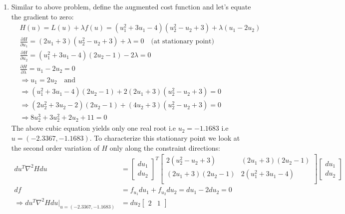 \begin{enumerate}
\begin{enumerate}
   \item %
    Similar to above problem, define the augmented cost function and let's equate the
gradient to zero:
    \begin{align*}
     &H(u) = L(u) + \lambda f(u) = (u_1^2 + 3 u_1 - 4) (u_2^2 - u_2 + 3)
+ \lambda (u_1 - 2 u_2) \\
     &\frac{\partial H}{\partial u_1} = (2 u_1 + 3)(u_2^2 - u_2 + 3) +
\lambda = 0 \quad \text{(at stationary point)} \\
     &\frac{\partial H}{\partial u_2} = (u_1^2 + 3 u_1 - 4)(2 u_2 - 1) -
2 \lambda = 0\\
     &\frac{\partial H}{\partial \lambda} = u_1 - 2u_2 = 0 \\
     &\Rightarrow u_1 = 2u_2 \quad \text{and}\\
     &\Rightarrow (u_1^2 + 3 u_1 - 4)(2 u_2 - 1) + 2 (2 u_1 + 3)(u_2^2 - u_2 +
3) = 0\\
     &\Rightarrow (2 u_2^2 + 3 u_2 -2)(2 u_2 -1) +  (4 u_2 + 3)(u_2^2 - u_2 + 3)
= 0\\
     &\Rightarrow 8 u_2^3 + 3 u_2^2 +2 u_2 + 11 = 0
    \end{align*}
    The above cubic equation yields only one real root i.e $u_2 = -1.1683$ i.e $u
= (-2.3367,-1.1683)$. To characterize this stationary point we look at the second order variation
of $H$ only along the constraint directions:
    \begin{align*}
     du^T \nabla^2 H du &= \begin{bmatrix}
			      du_1\\
			      du_2
			    \end{bmatrix}^T
			    \begin{bmatrix}
			    2(u_2^2 - u_2 + 3) & (2u_1 + 3) (2 u_2 - 1) \\
			    (2 u_1 + 3) (2 u_2 -1) & 2(u_1^2 + 3 u_1 - 4) \\
                         \end{bmatrix}
                         \begin{bmatrix}
			      du_1\\
			      du_2
			    \end{bmatrix}\\
	df &= f_{u_1} du_1 + f_{u_2} du_2 = du_1 -2du_2 = 0 \\
	\Rightarrow du^T \nabla^2 H du |_{u=(-2.3367, -1.1683)} &= du_2 \begin{bmatrix}
	                                        2 & 1
	                                       \end{bmatrix}

\end{align*}
\end{enumerate}
\end{enumerate}
